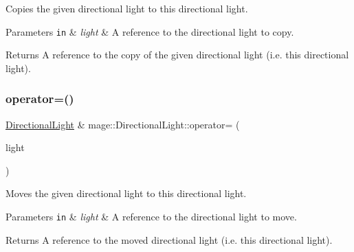 Copies the given directional light to this directional light.


\begin{DoxyParams}[1]{Parameters}
\mbox{\tt in}  & {\em light} & A reference to the directional light to copy. \\
\hline
\end{DoxyParams}
\begin{DoxyReturn}{Returns}
A reference to the copy of the given directional light (i.\+e. this directional light). 
\end{DoxyReturn}
\hypertarget{classmage_1_1_directional_light_a508b595bf6aa5fc9db53e0a854fda41d}{}\label{classmage_1_1_directional_light_a508b595bf6aa5fc9db53e0a854fda41d} 
\subsubsection{\texorpdfstring{operator=()}{operator=()}\hspace{0.1cm}{\footnotesize\ttfamily [2/2]}}
{\footnotesize\ttfamily \hyperlink{classmage_1_1_directional_light}{Directional\+Light} \& mage\+::\+Directional\+Light\+::operator= (\begin{DoxyParamCaption}\item[{\hyperlink{classmage_1_1_directional_light}{Directional\+Light} \&\&}]{light }\end{DoxyParamCaption})\hspace{0.3cm}{\ttfamily [default]}}

Moves the given directional light to this directional light.


\begin{DoxyParams}[1]{Parameters}
\mbox{\tt in}  & {\em light} & A reference to the directional light to move. \\
\hline
\end{DoxyParams}
\begin{DoxyReturn}{Returns}
A reference to the moved directional light (i.\+e. this directional light). 
\end{DoxyReturn}
\hypertarget{classmage_1_1_directional_light_ac8b63948d393696ca8745c799328be84}{}\label{classmage_1_1_directional_light_ac8b63948d393696ca8745c799328be84} 
